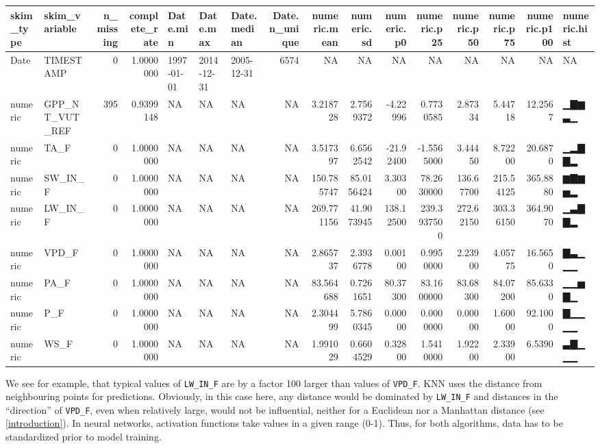 \documentclass[
]{book}
\begin{document}
\begin{tabular}{l|l|r|r|l|l|l|r|r|r|r|r|r|r|r|l}
\hline
skim\_type & skim\_variable & n\_missing & complete\_rate & Date.min & Date.max & Date.median & Date.n\_unique & numeric.mean & numeric.sd & numeric.p0 & numeric.p25 & numeric.p50 & numeric.p75 & numeric.p100 & numeric.hist\\
\hline
Date & TIMESTAMP & 0 & 1.0000000 & 1997-01-01 & 2014-12-31 & 2005-12-31 & 6574 & NA & NA & NA & NA & NA & NA & NA & NA\\
\hline
numeric & GPP\_NT\_VUT\_REF & 395 & 0.9399148 & NA & NA & NA & NA & 3.218728 & 2.7569372 & -4.22996 & 0.7730585 & 2.87334 & 5.44718 & 12.2567 & ▁▇▆▃▁\\
\hline
numeric & TA\_F & 0 & 1.0000000 & NA & NA & NA & NA & 3.517397 & 6.6562542 & -21.92400 & -1.5565000 & 3.44450 & 8.72200 & 20.6870 & ▁▂▇▇▂\\
\hline
numeric & SW\_IN\_F & 0 & 1.0000000 & NA & NA & NA & NA & 150.785747 & 85.0156424 & 3.30300 & 78.2630000 & 136.67700 & 215.54125 & 365.8880 & ▆▇▆▅▂\\
\hline
numeric & LW\_IN\_F & 0 & 1.0000000 & NA & NA & NA & NA & 269.771156 & 41.9073945 & 138.12500 & 239.3937500 & 272.62150 & 303.36150 & 364.9070 & ▁▃▇▇▂\\
\hline
numeric & VPD\_F & 0 & 1.0000000 & NA & NA & NA & NA & 2.865737 & 2.3936778 & 0.00100 & 0.9950000 & 2.23900 & 4.05775 & 16.5650 & ▇▃▁▁▁\\
\hline
numeric & PA\_F & 0 & 1.0000000 & NA & NA & NA & NA & 83.564688 & 0.7261651 & 80.37300 & 83.1600000 & 83.68300 & 84.07200 & 85.6330 & ▁▁▅▇▁\\
\hline
numeric & P\_F & 0 & 1.0000000 & NA & NA & NA & NA & 2.304499 & 5.7860345 & 0.00000 & 0.0000000 & 0.00000 & 1.60000 & 92.1000 & ▇▁▁▁▁\\
\hline
numeric & WS\_F & 0 & 1.0000000 & NA & NA & NA & NA & 1.991029 & 0.6604529 & 0.32800 & 1.5410000 & 1.92200 & 2.33900 & 6.5390 & ▃▇▁▁▁\\
\hline
\end{tabular}

We see for example, that typical values of \texttt{LW\_IN\_F} are by a factor 100 larger than values of \texttt{VPD\_F}. KNN uses the distance from neighbouring points for predictions. Obviously, in this case here, any distance would be dominated by \texttt{LW\_IN\_F} and distances in the ``direction'' of \texttt{VPD\_F}, even when relatively large, would not be influential, neither for a Euclidean nor a Manhattan distance (see \ref{introduction}). In neural networks, activation functions take values in a given range (0-1). Thus, for both algorithms, data has to be standardized prior to model training.
\end{document}

